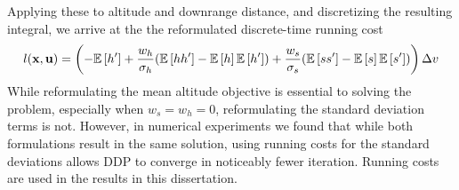 Applying these to altitude and downrange distance, and discretizing the resulting integral, we arrive at the 
the reformulated discrete-time running cost
\begin{align}
	l(\mathbf{x},\mathbf{u}) = \left(-\mathbb{E}\left[h'\right] +  \frac{w_h}{\sigma_h}(\mathbb{E}\left[hh'\right]-\mathbb{E}\left[h\right]\mathbb{E}\left[h'\right]) + \frac{w_s}{\sigma_s}(\mathbb{E}\left[ss'\right]-\mathbb{E}\left[s\right]\mathbb{E}\left[s'\right])\right)\Delta v
\end{align}
While reformulating the mean altitude objective is essential to solving the problem, especially when $w_s=w_h=0$, reformulating the standard deviation terms is not. However, in numerical experiments we found that while both formulations result in the same solution, using running costs for the standard deviations allows DDP to converge in noticeably fewer iteration. Running costs are used in the results in this dissertation.

